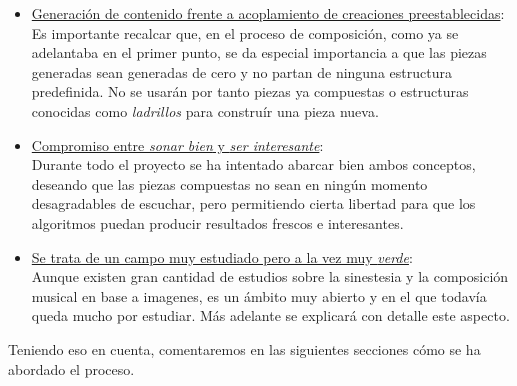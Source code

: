 \begin{itemize}
		\item \underline{Generación de contenido frente a acoplamiento de creaciones preestablecidas}:\\				
			Es importante recalcar que, en el proceso de composición, como ya se adelantaba en el primer punto, se da especial importancia a que las piezas generadas sean generadas de cero y no partan de ninguna estructura predefinida. No se usarán por tanto piezas ya compuestas o estructuras conocidas como \emph{ladrillos} para construír una pieza nueva.
		\item \underline{Compromiso entre \emph{sonar bien} y \emph{ser interesante}}:\\
			Durante todo el proyecto se ha intentado abarcar bien ambos conceptos, deseando que las piezas compuestas no sean en ningún momento desagradables de escuchar, pero permitiendo cierta libertad para que los algoritmos puedan producir resultados frescos e interesantes.
		\item \underline{Se trata de un campo muy estudiado pero a la vez muy \emph{verde}}:\\	
			Aunque existen gran cantidad de estudios sobre la sinestesia y la composición musical en base a imagenes, es un ámbito muy abierto y en el que todavía queda mucho por estudiar. Más adelante se explicará con detalle este aspecto.
			
		\end{itemize}
			
		Teniendo eso en cuenta, comentaremos en las siguientes secciones cómo se ha abordado el proceso. 
	




